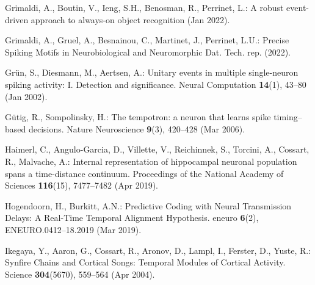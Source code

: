 \documentclass[runningheads]{llncs}
\begin{document}
\begin{thebibliography}{10}
  Grimaldi, A., Boutin, V., Ieng, S.H., Benosman, R., Perrinet, L.: A robust event-driven approach to always-on object recognition  (Jan 2022). 
  
  Grimaldi, A., Gruel, A., Besnainou, C., Martinet, J., Perrinet, L.U.: Precise {Spiking} {Motifs} in {Neurobiological} and {Neuromorphic} {Dat}. Tech. rep. (2022). 
  
  Grün, S., Diesmann, M., Aertsen, A.: Unitary events in multiple single-neuron spiking activity: {I}. {Detection} and significance. Neural Computation  \textbf{14}(1),  43--80 (Jan 2002). %
  
  
  Gütig, R., Sompolinsky, H.: The tempotron: a neuron that learns spike timing–based decisions. Nature Neuroscience  \textbf{9}(3),  420--428 (Mar 2006). 
  
  Haimerl, C., Angulo-Garcia, D., Villette, V., Reichinnek, S., Torcini, A., Cossart, R., Malvache, A.: Internal representation of hippocampal neuronal population spans a time-distance continuum. Proceedings of the National Academy of Sciences  \textbf{116}(15),  7477--7482 (Apr 2019). 
  
  
  Hogendoorn, H., Burkitt, A.N.: Predictive {Coding} with {Neural} {Transmission} {Delays}: {A} {Real}-{Time} {Temporal} {Alignment} {Hypothesis}. eneuro  \textbf{6}(2),  ENEURO.0412--18.2019 (Mar 2019). 
  
  Ikegaya, Y., Aaron, G., Cossart, R., Aronov, D., Lampl, I., Ferster, D., Yuste, R.: Synfire {Chains} and {Cortical} {Songs}: {Temporal} {Modules} of {Cortical} {Activity}. Science  \textbf{304}(5670),  559--564 (Apr 2004). 
  

\end{thebibliography}
\end{document}

